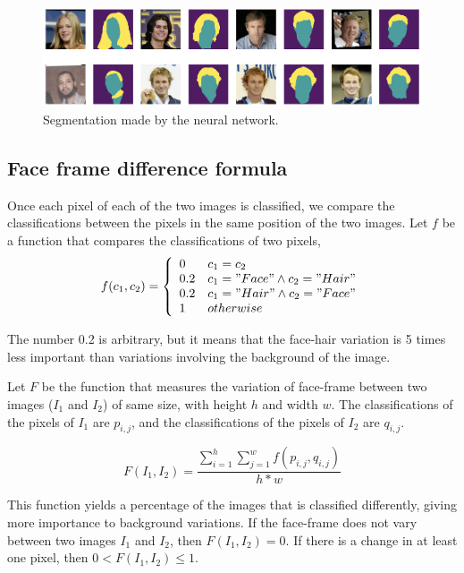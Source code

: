\documentclass[review]{elsarticle}
\begin{document}
\begin{figure}[H]
  \includegraphics[width=\linewidth, center]{Images/segmentation.png}
  \caption{Segmentation made by the neural network.~\citep{segmentationgithub}}
  \label{fig:segmentation}
\end{figure}

\subsection{Face frame difference formula}
\label{subsection:face_frame_difference_formula}
Once each pixel of each of the two images is classified, we compare the classifications between the pixels in the same position of the two images. Let $f$ be a function that compares the classifications of two pixels,
\begin{equation}
f(c_1, c_2) = 
   \left\{
\begin{array}{ll}
      0 & c_1 = c_2 \\
      0.2 & c_1 = "Face" \land c_2 = "Hair" \\
      0.2 & c_1 = "Hair" \land c_2 = "Face" \\
      1 & otherwise \\
\end{array} 
\right. 
\end{equation}

The number 0.2 is arbitrary, but it means that the face-hair variation is 5 times less important than variations involving the background of the image.

Let $F$ be the function that measures the variation of face-frame between two images ($I_1$ and $I_2$) of same size, with height $h$ and width $w$. The classifications of the pixels of $I_1$ are $p_{i,j}$, and the classifications of the pixels of $I_2$ are $q_{i,j}$.

\begin{equation}
F(I_1, I_2) = \frac{\sum_{i=1}^{h} \sum_{j=1}^{w} f(p_{i,j}, q_{i,j})}{h*w}
\end{equation}

This function yields a percentage of the images that is classified differently, giving more importance to background variations. If the face-frame does not vary between two images $I_1$ and $I_2$, then $F(I_1, I_2)=0$. If there is a change in at least one pixel, then $0 < F(I_1, I_2) \leq 1$.
\end{document}
